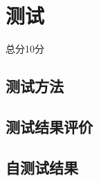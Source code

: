 \section{测试}
\begin{center}
    总分10分
\end{center}

\subsection{测试方法}


\subsection{测试结果评价}


\subsection{自测试结果}


